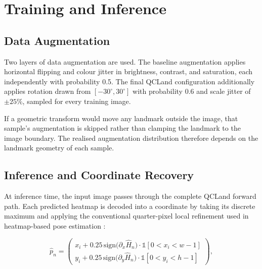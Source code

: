 
\section{Training and Inference}
\label{sec:method-training}


\subsection{Data Augmentation}
\label{sec:method-augmentation}

Two layers of data augmentation are used. The baseline augmentation
applies horizontal flipping and colour jitter in brightness, contrast,
and saturation, each independently with probability 0.5. The final
QCLand configuration additionally applies rotation drawn from
$[-30^\circ,30^\circ]$ with probability 0.6 and scale jitter of
$\pm25\%$, sampled for every training image.

If a geometric transform would move any landmark outside the image,
that sample's augmentation is skipped rather than clamping the
landmark to the image boundary. The realised augmentation
distribution therefore depends on the landmark geometry of each
sample.


\subsection{Inference and Coordinate Recovery}
\label{sec:method-inference}

At inference time, the input image passes through the complete QCLand
forward path. Each predicted heatmap is decoded into a coordinate by
taking its discrete maximum and applying the conventional
quarter-pixel local refinement used in heatmap-based pose estimation
\parencite{xiao2018simple,huang2020udp}:

\begin{equation}
  \label{eq:coord-decode}
  \hat{p}_n
  =
  \begin{pmatrix}
    x_i
    +
    0.25\,
    \mathrm{sign}
      \bigl(\partial_x\hat{H}_n\bigr)
    \cdot
    \mathbb{1}[0<x_i<w-1]
    \\[4pt]
    y_i
    +
    0.25\,
    \mathrm{sign}
      \bigl(\partial_y\hat{H}_n\bigr)
    \cdot
    \mathbb{1}[0<y_i<h-1]
  \end{pmatrix},
\end{equation}

